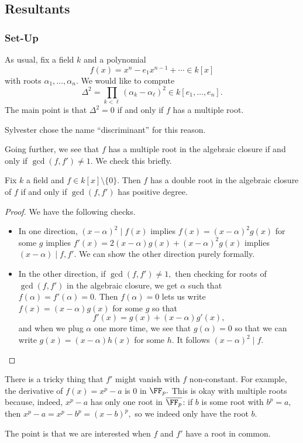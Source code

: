 \documentclass[../notes.tex]{subfiles}
\begin{document}
\subsection{Resultants}
\subsubsection{Set-Up}
As usual, fix a field $k$ and a polynomial
\[f(x)=x^n-e_1x^{n-1}+\cdots\in k[x]\]
with roots $\alpha_1,\ldots,\alpha_n.$ We would like to compute
\[\Delta^2=\prod_{k<\ell}(\alpha_k-\alpha_\ell)^2\in k[e_1,\ldots,e_n].\]
The main point is that $\Delta^2=0$ if and only if $f$ has a multiple root.
\begin{remark}
	Sylvester chose the name ``discriminant'' for this reason.
\end{remark}
Going further, we see that $f$ has a multiple root in the algebraic closure if and only if $\gcd(f,f')\ne1.$ We check this briefly.
\begin{lemma}
	Fix $k$ a field and $f\in k[x]\setminus\{0\}.$ Then $f$ has a double root in the algebraic closure of $f$ if and only if $\gcd(f,f')$ has positive degree.
\end{lemma}
\begin{proof}
	We have the following checks.
	\begin{itemize}
		\item In one direction, $(x-\alpha)^2\mid f(x)$ implies $f(x)=(x-\alpha)^2g(x)$ for some $g$ implies $f'(x)=2(x-\alpha)g(x)+(x-\alpha)^2g(x)$ implies $(x-\alpha)\mid f,f'.$ We can show the other direction purely formally.
		\item In the other direction, if $\gcd(f,f')\ne1,$ then checking for roots of $\gcd(f,f')$ in the algebraic closure, we get $\alpha$ such that $f(\alpha)=f'(\alpha)=0.$ Then $f(\alpha)=0$ lets us write $f(x)=(x-\alpha)g(x)$ for some $g$ so that
		\[f'(x)=g(x)+(x-\alpha)g'(x),\]
		and when we plug $\alpha$ one more time, we see that $g(\alpha)=0$ so that we can write $g(x)=(x-\alpha)h(x)$ for some $h.$ It follows $(x-\alpha)^2\mid f.$
		\qedhere
	\end{itemize}
\end{proof}
\begin{remark}
	There is a tricky thing that $f'$ might vanish with $f$ non-constant. For example, the derivative of $f(x)=x^p-a$ is $0$ in $\FF_p.$ This is okay with multiple roots because, indeed, $x^p-a$ has only one root in $\overline{\FF_p}$: if $b$ is some root with $b^p=a,$ then $x^p-a=x^p-b^p=(x-b)^p,$ so we indeed only have the root $b.$
\end{remark}
The point is that we are interested when $f$ and $f'$ have a root in common.
\end{document}
